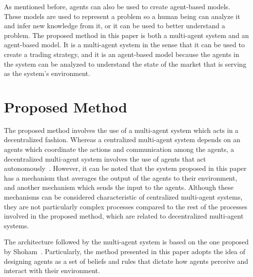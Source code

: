 \documentclass{ieeeaccess}
\begin{document}
As mentioned before, agents can also be used to create agent-based models. These
models are used to represent a problem so a human being can analyze it and infer
new knowledge from it, or it can be used to better understand a problem.
The proposed method in this paper is both a multi-agent system and an
agent-based model. It is a multi-agent system in the sense that it can be used
to create a trading strategy, and it is an agent-based model because the agents
in the system can be analyzed to understand the state of the market that is
serving as the system's environment.



\section{Proposed Method}
\label{section:proposed-method}


The proposed method involves the use of a multi-agent system which acts in a
decentralized fashion. Whereas a centralized multi-agent system depends on an
agents which coordinate the actions and communication among the agents, a
decentralized multi-agent system involves the use of agents that act
autonomously~\cite{andreadis2014classification}. However, it can be noted that
the system proposed in this paper has a mechanism that averages the output of
the agents to their environment, and another mechanism which sends the input to
the agents. Although these mechanisms can be considered characteristic of
centralized multi-agent systems, they are not particularly complex processes
compared to the rest of the processes involved in the proposed method, which are
related to decentralized multi-agent systems.

The architecture followed by the multi-agent system is based on the one proposed
by Shoham~\cite{Shoham1993}. Particularly, the method presented in this paper
adopts the idea of designing agents as a set of beliefs and rules that dictate
how agents perceive and interact with their environment.
\end{document}
